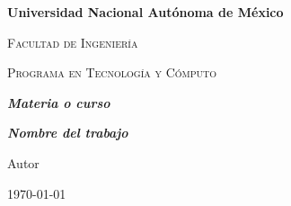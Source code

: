 \documentclass[letterpaper]{article} %
\begin{document}
    \begin{figure}[H]
        \begin{titlepage}
            
            \centering
            \hspace{2cm}
            \hspace{2cm}

            \vspace{1cm}
                                    
            \centering
            {\bfseries\LARGE Universidad Nacional Autónoma de México \par}
            \vspace{1cm}
            {\scshape\Large Facultad de Ingenier\'ia \par}
            \vspace{2cm}
            {\scshape\Huge Programa en Tecnolog\'ia y C\'omputo \par}
            \vspace{2cm}
            {\itshape\Large \textbf{Materia o curso\\} \par} 
            \vspace{1cm}
            {\itshape\Large \textbf{Nombre del trabajo\\} \par}
            \vspace{1cm}
            \vfill
            {\Large Autor \\\par}
            \vfill
            \vspace{1cm}
            {\large \today\par}
        \end{titlepage}
	\end{figure}
\end{document}
